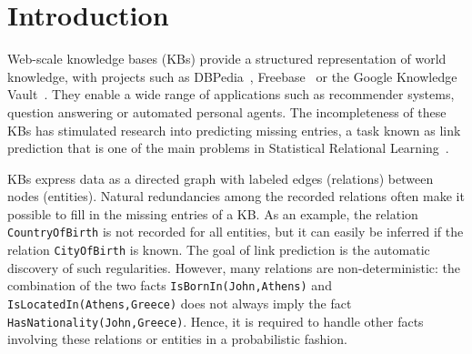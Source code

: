 \documentclass{article}
\def\tt{\texttt}
\newcommand{\Seb}[1]{\todo[inline,backgroundcolor=white!20!white]{Seb: #1}}
\begin{document}
\section{Introduction}

Web-scale knowledge bases (KBs) provide a structured representation of world knowledge, with projects such as DBPedia~\cite{dbpedia}, Freebase~\cite{Bollacker2008} or the Google Knowledge Vault~\cite{Dong:2014:KnowledgeVault}. 
They enable a wide range of applications such as recommender systems, question answering or automated personal agents. The incompleteness of these KBs has stimulated \mbox{research} into predicting missing entries, a task known as link prediction that is one of the main problems in Statistical Relational Learning~\citep[SRL,][]{Getoor2007}.




KBs express data as a directed graph with labeled edges (relations) between nodes (entities). Natural redundancies among the recorded relations often make it possible to fill in the missing entries of a KB. 
As an example, the relation \tt{CountryOfBirth} is not recorded for all entities, 
but it can easily be inferred if the relation \tt{CityOfBirth} is known. 
The goal of link prediction is the automatic discovery of such regularities. However, many relations are non-deterministic:  the combination of the two facts \tt{IsBornIn(John,Athens)} and \tt{IsLocatedIn(Athens,Greece)} does not always imply the fact \tt{HasNationality(John,Greece)}. 
Hence, it is required to handle other facts involving these relations or entities in a probabilistic fashion.
\end{document}
